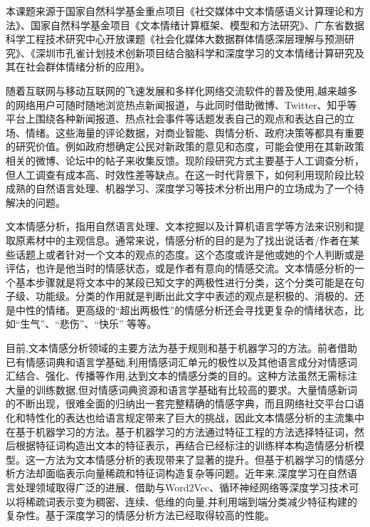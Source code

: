 


本课题来源于国家自然科学基金重点项目《社交媒体中文本情感语义计算理论和方法》、国家自然科学基金项目《文本情绪计算框架、模型和方法研究》、广东省数据科学工程技术研究中心开放课题《社会化媒体大数据群体情感深层理解与预测研究》、《深圳市孔雀计划技术创新项目结合脑科学和深度学习的文本情绪计算研究及其在社会群体情绪分析的应用》。



随着互联网与移动互联网的飞速发展和多样化网络交流软件的普及使用,越来越多的网络用户可随时随地浏览热点新闻报道，与此同时借助微博、Twitter、知乎等平台上围绕各种新闻报道、热点社会事件等话题发表自己的观点和表达自己的立场、情绪。这些海量的评论数据，对商业智能、舆情分析、政府决策等都具有重要的研究价值。例如政府想确定公民对新政策的意见和态度，可能会使用在其新政策相关的微博、论坛中的帖子来收集反馈。现阶段研究方式主要基于人工调查分析，但人工调查有成本高、时效性差等缺点。在这一时代背景下，如何利用现阶段比较成熟的自然语言处理、机器学习、深度学习等技术分析出用户的立场成为了一个待解决的问题。

文本情感分析，指用自然语言处理、文本挖掘以及计算机语言学等方法来识别和提取原素材中的主观信息。通常来说，情感分析的目的是为了找出说话者/作者在某些话题上或者针对一个文本的观点的态度。这个态度或许是他或她的个人判断或是评估，也许是他当时的情感状态，或是作者有意向的情感交流。文本情感分析的一个基本步骤就是将文本中的某段已知文字的两极性进行分类，这个分类可能是在句子级、功能级。分类的作用就是判断出此文字中表述的观点是积极的、消极的、还是中性的情绪。更高级的“超出两极性”的情感分析还会寻找更复杂的情绪状态，比如“生气”、“悲伤”、“快乐” 等等。

目前,文本情感分析领域的主要方法为基于规则和基于机器学习的方法。前者借助已有情感词典和语言学基础,利用情感词汇单元的极性以及其他语言成分对情感词汇结合、强化、传播等作用,达到文本的情感分类的目的。这种方法虽然无需标注大量的训练数据,但对情感词典资源和语言学基础有比较高的要求。大量情感新词的不断出现，很难全面的归纳出一套完整精确的情感字典，而且网络社交平台口语化和特性化的表达也给语言规定带来了巨大的挑战，因此文本情感分析的主流集中在基于机器学习的方法。基于机器学习的方法通过特征工程的方法选择特征词，然后根据特征词构造出文本的特征表示，再结合已经标注的训练样本构造情感分析模型。这一方法为文本情感分析的表现带来了显著的提升。但基于机器学习的情感分析方法却面临表示向量稀疏和特征词构造复杂等问题。近年来,深度学习在自然语言处理领域取得广泛的进展．借助与Word2Vec、循环神经网络等深度学习技术可以将稀疏词表示变为稠密、连续、低维的向量,并利用端到端分类减少特征构建的复杂性。基于深度学习的情感分析方法已经取得较高的性能。

